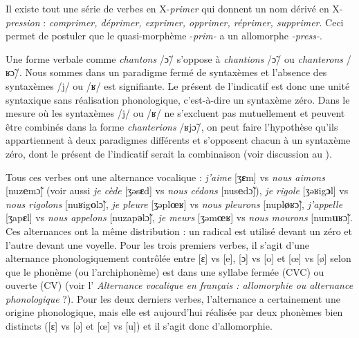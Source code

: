 {     Il existe tout une série de verbes en X-\textit{primer} qui donnent un nom dérivé en X-\textit{pression} : \textit{comprimer, déprimer, exprimer, opprimer, réprimer, supprimer}. Ceci permet de postuler que le quasi-morphème -\textit{prim-} a un allomorphe \textit{{}-press-}.

     Une forme verbale comme \textit{chantons} /\~{ɔ}/ s’oppose à \textit{chantions} /\~{ɔ}/ ou \textit{chanterons} /ʁ\~{ɔ}/. Nous sommes dans un paradigme fermé de syntaxèmes et l’absence des syntaxèmes /j/ ou /ʁ/ est signifiante. Le présent de l’indicatif est donc une unité syntaxique sans réalisation phonologique, c’est-à-dire un syntaxème zéro. Dans le mesure où les syntaxèmes  /j/ ou /ʁ/ ne s'excluent pas mutuellement et peuvent être combinés dans la forme \textit{chanterions} /ʁj\~{ɔ}/, on peut faire l'hypothèse qu'ils appartiennent à deux paradigmes différents et s'opposent chacun à un syntaxème zéro, dont le présent de l'indicatif serait la combinaison (voir discussion au ).

     Tous ces verbes ont une alternance vocalique : \textit{j’aime} [ʒ\textbf{ɛ}m] vs \textit{nous aimons} [nuz\textbf{e}m\~{ɔ}] (voir aussi \textit{je cède} [ʒǝs\textbf{ɛ}d] vs \textit{nous cédons} [nus\textbf{e}d\~{ɔ}]), \textit{je rigole} [ʒǝʁig\textbf{ɔ}l] vs \textit{nous rigolons} [nuʁig\textbf{o}l\~{ɔ}], \textit{je pleure} [ʒǝpl\textbf{œ}ʁ] vs \textit{nous pleurons} [nupl\textbf{ø}ʁ\~{ɔ}], \textit{j’appelle} [ʒap\textbf{ɛ}l] vs \textit{nous appelons} [nuzap\textbf{ǝ}l\~{ɔ}], \textit{je meurs} [ʒǝm\textbf{œ}ʁ] vs \textit{nous mourons} [num\textbf{u}ʁ\~{ɔ}]. Ces alternances ont la même distribution : un radical est utilisé devant un zéro et l’autre devant une voyelle. Pour les trois premiers verbes, il s’agit d’une alternance phonologiquement contrôlée entre [ɛ] vs [e], [ɔ] vs [o] et [œ] vs [ø] selon que le phonème (ou l’archiphonème) est dans une syllabe fermée (CVC) ou ouverte (CV) (voir l’ \textit{Alternance vocalique en français : allomorphie ou alternance phonologique} ?). Pour les deux derniers verbes, l’alternance a certainement une origine phonologique, mais elle est aujourd’hui réalisée par deux phonèmes bien distincts ([ɛ] vs [ǝ] et [œ] vs [u]) et il s’agit donc d’allomorphie.
    
}
